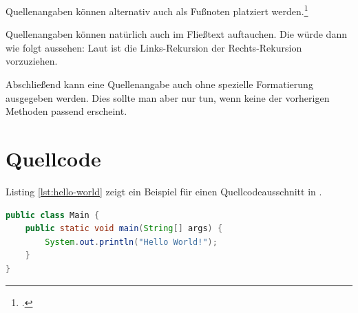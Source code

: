 Quellenangaben können alternativ auch als Fußnoten platziert werden.\footcite[7-14]{angenendt}

Quellenangaben können natürlich auch im Fließtext auftauchen. Die würde dann wie folgt aussehen: Laut \textcite[51]{angenendt} ist die Links-Rekursion der Rechts-Rekursion vorzuziehen.

Abschließend kann eine Quellenangabe auch ohne spezielle Formatierung ausgegeben werden. Dies sollte man aber nur tun, wenn keine der vorherigen Methoden passend erscheint. \cite[100-101]{angenendt}




\section{Quellcode}

Listing \vref{lst:hello-world} zeigt ein Beispiel für einen Quellcodeausschnitt in \latex.

\begin{lstlisting}[language=Java, caption={Hello World in Java}, label=lst:hello-world]
public class Main {
	public static void main(String[] args) {
		System.out.println("Hello World!");
	}
}
\end{lstlisting}
